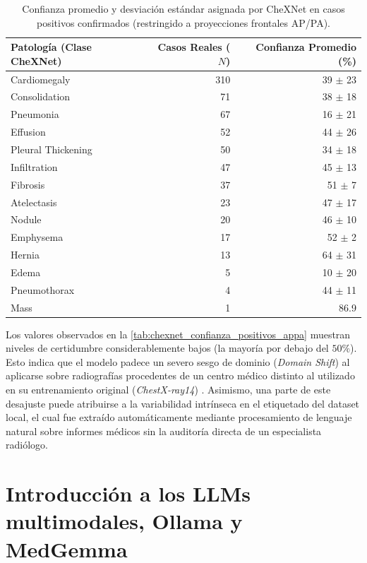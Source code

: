 \documentclass[../tesis.tex]{subfiles}
\begin{document}
\begin{table}[H]
\centering
\small
\begin{tabular}{lrr}
\toprule
\textbf{Patología (Clase CheXNet)} & \textbf{Casos Reales ($N$)} & \textbf{Confianza Promedio (\%)} \\
\midrule
Cardiomegaly        & 310 & 39 $\pm$ 23 \\
Consolidation       &  71 & 38 $\pm$ 18 \\
Pneumonia           &  67 & 16 $\pm$ 21 \\
Effusion            &  52 & 44 $\pm$ 26 \\
Pleural Thickening  &  50 & 34 $\pm$ 18 \\
Infiltration        &  47 & 45 $\pm$ 13 \\
Fibrosis            &  37 & 51 $\pm$ 7 \\
Atelectasis         &  23 & 47 $\pm$ 17 \\
Nodule              &  20 & 46 $\pm$ 10 \\
Emphysema           &  17 & 52 $\pm$ 2 \\
Hernia              &  13 & 64 $\pm$ 31 \\
Edema               &   5 & 10 $\pm$ 20 \\
Pneumothorax        &   4 & 44 $\pm$ 11 \\
Mass                &   1 & 86.9 \\
\bottomrule
\end{tabular}
\caption{Confianza promedio y desviación estándar asignada por CheXNet en casos positivos confirmados (restringido a proyecciones frontales AP/PA).}
\label{tab:chexnet_confianza_positivos_appa}
\end{table}

Los valores observados en la \autoref{tab:chexnet_confianza_positivos_appa} muestran niveles de certidumbre considerablemente bajos (la mayoría por debajo del $50\%$). Esto indica que el modelo padece un severo sesgo de dominio (\textit{Domain Shift}) al aplicarse sobre radiografías procedentes de un centro médico distinto al utilizado en su entrenamiento original (\textit{ChestX-ray14}) \citep{Tiu_et_al._2022} \citep{Drukker_et_al._2023}. Asimismo, una parte de este desajuste puede atribuirse a la variabilidad intrínseca en el etiquetado del dataset local, el cual fue extraído automáticamente mediante procesamiento de lenguaje natural sobre informes médicos sin la auditoría directa de un especialista radiólogo.

\section{Introducción a los LLMs multimodales, Ollama y MedGemma}
\label{sec:intro_mllm_medgemma}
\end{document}
